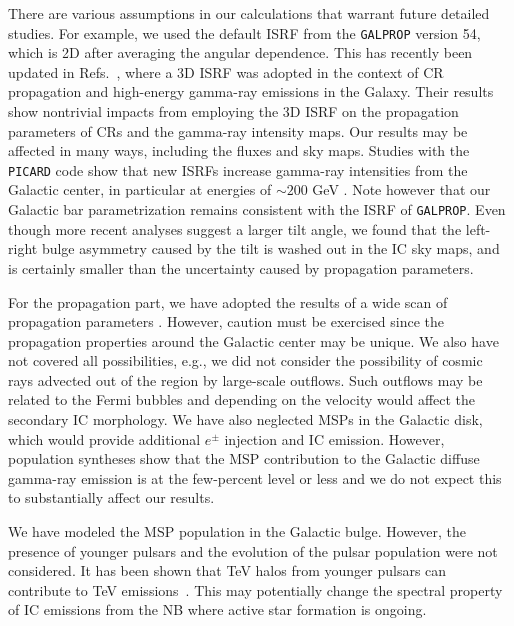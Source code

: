 \documentclass[doublespace,nopageskip]{VTthesis} %
\begin{document}
There are various assumptions in our calculations that warrant future detailed studies. For example, we used the default ISRF from the {\tt GALPROP} version 54, which is 2D after averaging the angular dependence. This has recently been updated in Refs.~\cite{Porter:2017vaa,Johannesson:2018bit}, where a 3D ISRF was adopted in the context of CR propagation and high-energy gamma-ray emissions in the Galaxy. Their results show nontrivial impacts from employing the 3D ISRF on the propagation parameters of CRs and the gamma-ray intensity maps. Our results may be affected in many ways, including the fluxes and sky maps. Studies with the {\tt PICARD} code show that new ISRFs increase gamma-ray intensities from the Galactic center, in particular at energies of $\sim 200 $ GeV \cite{Niederwanger:2018zsv}. Note however that our Galactic bar parametrization remains consistent with the ISRF of {\tt GALPROP}. Even though more recent analyses suggest a larger tilt angle, we found that the left-right bulge asymmetry caused by the tilt is washed out in the IC sky maps, and is certainly smaller than the uncertainty caused by propagation parameters.

For the propagation part, we have adopted the results of a wide scan of propagation parameters \cite{Johannesson:2016rlh}. However, caution must be exercised since the propagation properties around the Galactic center may be unique. We also have not covered all possibilities, e.g., we did not consider the possibility of cosmic rays advected out of the region by large-scale outflows. Such outflows may be related to the Fermi bubbles \cite{Crocker:2014fla} and depending on the velocity would affect the secondary IC morphology. We have also neglected MSPs in the Galactic disk, which would provide additional $e^\pm$ injection and IC emission. However, population syntheses show that the MSP contribution to the Galactic diffuse gamma-ray emission is at the few-percent level or less \cite{Gonthier:2018ymi} and we do not expect this to substantially affect our results.

We have modeled the MSP population in the Galactic bulge. However, the presence of younger pulsars and the evolution of the pulsar population were not considered. It has been shown that TeV halos from younger pulsars can contribute to TeV emissions~\cite{Hooper:2017rzt}. This may potentially change the spectral property of IC emissions from the NB where active star formation is ongoing.
\end{document}
